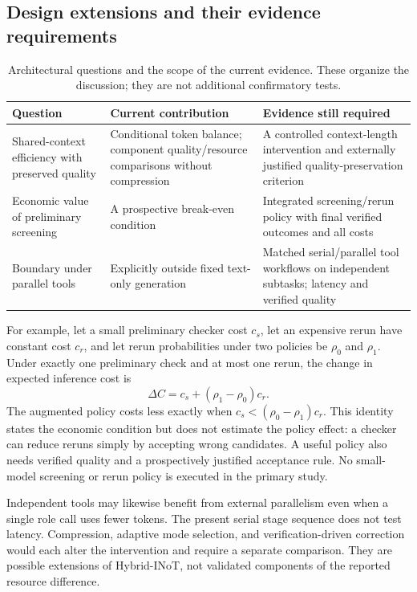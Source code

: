 \subsection{Design extensions and their evidence requirements}
\begin{table}[htbp]\centering\small
\caption{Architectural questions and the scope of the current evidence. These organize the discussion; they are not additional confirmatory tests.}
\label{tab:hybrid-scope}
\begin{tabularx}{\textwidth}{@{}>{\raggedright\arraybackslash}p{}>{\raggedright\arraybackslash}X>{\raggedright\arraybackslash}X@{}}\toprule
Question & Current contribution & Evidence still required\\\midrule
Shared-context efficiency with preserved quality & Conditional token balance; component quality/resource comparisons without compression & A controlled context-length intervention and externally justified quality-preservation criterion\\
Economic value of preliminary screening & A prospective break-even condition & Integrated screening/rerun policy with final verified outcomes and all costs\\
Boundary under parallel tools & Explicitly outside fixed text-only generation & Matched serial/parallel tool workflows on independent subtasks; latency and verified quality\\\bottomrule
\end{tabularx}\end{table}

For example, let a small preliminary checker cost $c_s$, let an expensive rerun have constant cost $c_r$, and let rerun probabilities under two policies be $\rho_0$ and $\rho_1$. Under exactly one preliminary check and at most one rerun, the change in expected inference cost is
\begin{equation}
\Delta C=c_s+(\rho_1-\rho_0)c_r.
\label{eq:hybrid-screen}
\end{equation}
The augmented policy costs less exactly when $c_s<(\rho_0-\rho_1)c_r$. This identity states the economic condition but does not estimate the policy effect: a checker can reduce reruns simply by accepting wrong candidates. A useful policy also needs verified quality and a prospectively justified acceptance rule. No small-model screening or rerun policy is executed in the primary study.

Independent tools may likewise benefit from external parallelism even when a single role call uses fewer tokens. The present serial stage sequence does not test latency. Compression, adaptive mode selection, and verification-driven correction would each alter the intervention and require a separate comparison. They are possible extensions of Hybrid-INoT, not validated components of the reported resource difference.
